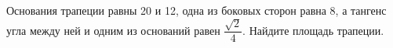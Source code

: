 \begin{ex}
	\begin{condition}
		Основания трапеции равны 20 и 12, одна из боковых сторон равна 8, а тангенс угла между ней и одним из оснований равен \( \dfrac{\sqrt{2}}{4} \). Найдите площадь трапеции.
	\end{condition}
\end{ex}